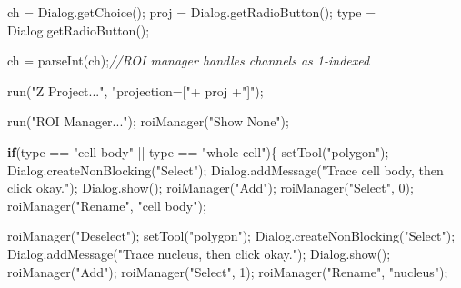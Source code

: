 \documentclass[
  12pt,
  a4paper,
]{book}
\newenvironment{Shaded}{}{}
\newcommand{\CommentTok}[1]{\textcolor[rgb]{0.38,0.63,0.69}{\textit{#1}}}
\newcommand{\ControlFlowTok}[1]{\textcolor[rgb]{0.00,0.44,0.13}{\textbf{#1}}}
\newcommand{\DecValTok}[1]{\textcolor[rgb]{0.25,0.63,0.44}{#1}}
\newcommand{\NormalTok}[1]{#1}
\newcommand{\OperatorTok}[1]{\textcolor[rgb]{0.40,0.40,0.40}{#1}}
\newcommand{\StringTok}[1]{\textcolor[rgb]{0.25,0.44,0.63}{#1}}
\begin{document}
\begin{Shaded}
\begin{Highlighting}[]
\NormalTok{ch }\OperatorTok{=}\NormalTok{ Dialog}\OperatorTok{.}\NormalTok{getChoice}\OperatorTok{();}
\NormalTok{proj }\OperatorTok{=}\NormalTok{ Dialog}\OperatorTok{.}\NormalTok{getRadioButton}\OperatorTok{();}
\NormalTok{type }\OperatorTok{=}\NormalTok{ Dialog}\OperatorTok{.}\NormalTok{getRadioButton}\OperatorTok{();}

\NormalTok{ch }\OperatorTok{=}\NormalTok{ parseInt}\OperatorTok{(}\NormalTok{ch}\OperatorTok{);}\CommentTok{//ROI manager handles channels as 1{-}indexed}

\NormalTok{run}\OperatorTok{(}\StringTok{"Z Project..."}\OperatorTok{,} \StringTok{"projection=["}\OperatorTok{+}\NormalTok{ proj }\OperatorTok{+}\StringTok{"]"}\OperatorTok{);}

\NormalTok{run}\OperatorTok{(}\StringTok{"ROI Manager..."}\OperatorTok{);}
\NormalTok{roiManager}\OperatorTok{(}\StringTok{"Show None"}\OperatorTok{);}

\ControlFlowTok{if}\OperatorTok{(}\NormalTok{type }\OperatorTok{==} \StringTok{"cell body"} \OperatorTok{||}\NormalTok{ type }\OperatorTok{==} \StringTok{"whole cell"}\OperatorTok{)\{}
\NormalTok{    setTool}\OperatorTok{(}\StringTok{"polygon"}\OperatorTok{);}
\NormalTok{    Dialog}\OperatorTok{.}\NormalTok{createNonBlocking}\OperatorTok{(}\StringTok{"Select"}\OperatorTok{);}
\NormalTok{    Dialog}\OperatorTok{.}\NormalTok{addMessage}\OperatorTok{(}\StringTok{"Trace cell body, then click \textquotesingle{}okay\textquotesingle{}."}\OperatorTok{);}
\NormalTok{    Dialog}\OperatorTok{.}\NormalTok{show}\OperatorTok{();}
\NormalTok{    roiManager}\OperatorTok{(}\StringTok{"Add"}\OperatorTok{);}
\NormalTok{    roiManager}\OperatorTok{(}\StringTok{"Select"}\OperatorTok{,} \DecValTok{0}\OperatorTok{);}
\NormalTok{    roiManager}\OperatorTok{(}\StringTok{"Rename"}\OperatorTok{,} \StringTok{"cell body"}\OperatorTok{);}

\NormalTok{    roiManager}\OperatorTok{(}\StringTok{"Deselect"}\OperatorTok{);}
\NormalTok{    setTool}\OperatorTok{(}\StringTok{"polygon"}\OperatorTok{);}
\NormalTok{    Dialog}\OperatorTok{.}\NormalTok{createNonBlocking}\OperatorTok{(}\StringTok{"Select"}\OperatorTok{);}
\NormalTok{    Dialog}\OperatorTok{.}\NormalTok{addMessage}\OperatorTok{(}\StringTok{"Trace nucleus, then click \textquotesingle{}okay\textquotesingle{}."}\OperatorTok{);}
\NormalTok{    Dialog}\OperatorTok{.}\NormalTok{show}\OperatorTok{();}
\NormalTok{    roiManager}\OperatorTok{(}\StringTok{"Add"}\OperatorTok{);}
\NormalTok{    roiManager}\OperatorTok{(}\StringTok{"Select"}\OperatorTok{,} \DecValTok{1}\OperatorTok{);}
\NormalTok{    roiManager}\OperatorTok{(}\StringTok{"Rename"}\OperatorTok{,} \StringTok{"nucleus"}\OperatorTok{);}


\end{Highlighting}
\end{Shaded}
\end{document}
